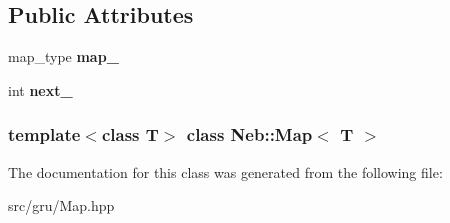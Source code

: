 \subsection*{\-Public \-Attributes}
\begin{DoxyCompactItemize}
\item 
\hypertarget{classNeb_1_1Map_a90e63f3ea00d82d366192f092cdb5fa9}{map\-\_\-type {\bfseries map\-\_\-}}\label{classNeb_1_1Map_a90e63f3ea00d82d366192f092cdb5fa9}

\item 
\hypertarget{classNeb_1_1Map_a8b62fd79e9fc42a74a72f22c21a932ba}{int {\bfseries next\-\_\-}}\label{classNeb_1_1Map_a8b62fd79e9fc42a74a72f22c21a932ba}

\end{DoxyCompactItemize}
\subsubsection*{template$<$class \-T$>$ class Neb\-::\-Map$<$ T $>$}



\-The documentation for this class was generated from the following file\-:\begin{DoxyCompactItemize}
\item 
src/gru/\-Map.\-hpp\end{DoxyCompactItemize}
